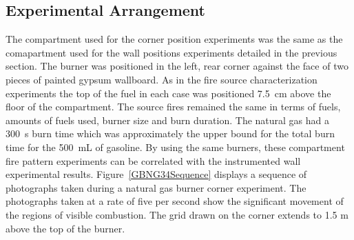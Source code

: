 \documentclass[twoside]{uocthesis}
\begin{document}
\subsection{Experimental Arrangement}

The compartment used for the corner position experiments was the same as the comapartment used for the wall positions experiments detailed in the previous section.  The burner was positioned in the left, rear corner against the face of two pieces of painted gypsum wallboard. As in the fire source characterization experiments the top of the fuel in each case was positioned 7.5~cm above the floor of the compartment. The source fires remained the same in terms of fuels, amounts of fuels used, burner size and burn duration.  The natural gas had a 300~s burn time which was approximately the upper bound for the total burn time for the 500~mL of gasoline.  By using the same burners, these compartment fire pattern experiments can be correlated with the instrumented wall experimental results.  Figure~\ref{GBNG34Sequence} displays a sequence of photographs taken during a natural gas burner corner experiment.  The photographs taken at a rate of five per second show the significant movement of the regions of visible combustion.  The grid drawn on the corner extends to 1.5 m above the top of the burner. 
\end{document}
